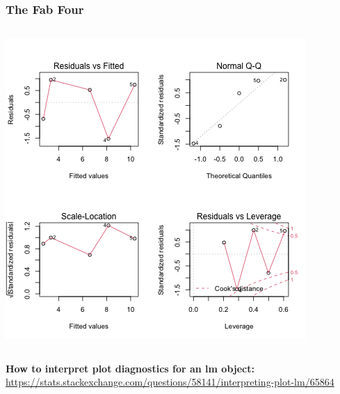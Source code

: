 \documentclass{beamer}
\newenvironment{VerbatimIN}
 {\VerbatimEnvironment
  \begin{tcolorbox}[
    breakable,
    colback=lightgray,
    spartan
  ]%
  \begin{Verbatim}}
 {\end{Verbatim}\end{tcolorbox}}
\begin{document}
\begin{frame}[fragile]
    \frametitle{The Fab Four}
        \begin{columns}
        \begin{column}{0.6\textwidth}
        \includegraphics[width=\textwidth]{lectures/day_2_LM_refresh_I/figures/unnamed-chunk-40-1.png}     
        \end{column}
        \end{columns}
\end{frame}

\begin{frame}
    \large\textbf{How to interpret plot diagnostics for an lm object:}
    \url{https://stats.stackexchange.com/questions/58141/interpreting-plot-lm/65864}
\end{frame}
\end{document}
